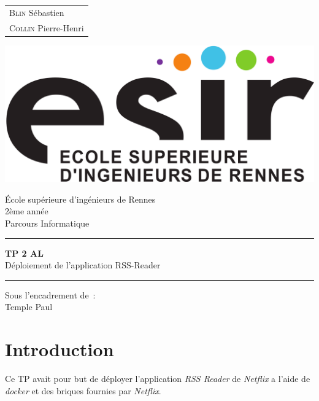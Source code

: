 \documentclass{article}
\begin{document}
	\begin{titlepage}
		\vspace{-20px}
		\begin{tabular}{l}
			\textsc{Blin} Sébastien\\
			\textsc{Collin} Pierre-Henri
		\end{tabular}
		\hfill \vspace{10px}\includegraphics[scale=0.1]{esir}\\
		\vfill
		\begin{center}
			\Huge{\'Ecole sup\'erieure d'ing\'enieurs de Rennes}\\
			\vspace{1cm}
			\LARGE{2ème année}\\
			\large{Parcours Informatique}\\
			\vspace{0.5cm}\hrule\vspace{0.5cm}
			\LARGE{\textbf{TP 2 AL}}\\
			\Large{Déploiement de l'application RSS-Reader}
			\vspace{0.5cm}\hrule
			\vfill
			\vfill
		\end{center}
		\begin{flushleft}
			\Large{Sous l'encadrement de~:}\\
			\vspace{0.2cm}
			\large{{Temple} Paul}
		\end{flushleft}
		\vfill
	\end{titlepage}

	\section{Introduction}
	Ce TP avait pour but de déployer l'application \emph{RSS Reader} de \emph{Netflix} a l'aide de \emph{docker} et des briques fournies par \emph{Netflix}.
\end{document}
